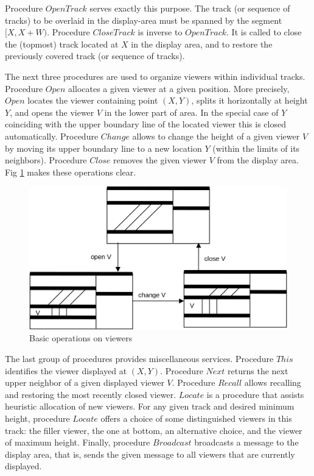 Procedure $OpenTrack$ serves exactly this purpose. The track (or sequence of tracks) to be
overlaid in the display-area must be spanned by the segment $[X, X + W)$. Procedure $CloseTrack$ is
inverse to $OpenTrack$. It is called to close the (topmost) track located at $X$ in the display area, and
to restore the previously covered track (or sequence of tracks).

The next three procedures are used to organize viewers within individual tracks. Procedure $Open$
allocates a given viewer at a given position. More precisely, $Open$ locates the viewer containing
point $(X, Y)$, splits it horizontally at height $Y$, and opens the viewer $V$ in the lower part of area. In the special case of $Y$ coinciding with the upper boundary line of the located viewer this is
closed automatically. Procedure $Change$ allows to change the height of a given viewer $V$ by
moving its upper boundary line to a new location $Y$ (within the limits of its neighbors). Procedure
$Close$ removes the given viewer $V$ from the display area. Fig \ref{fig:operation} makes these operations clear.
\begin{figure}
	\centering
	\includegraphics[width=\textwidth]{i/8}
	\caption{Basic operations on viewers}
	\label{fig:operation}
\end{figure}

The last group of procedures provides miscellaneous services. Procedure $This$ identifies the
viewer displayed at $(X, Y)$. Procedure $Next$ returns the next upper neighbor of a given displayed
viewer $V$. Procedure $Recall$ allows recalling and restoring the most recently closed viewer. $Locate$
is a procedure that assists heuristic allocation of new viewers. For any given track and desired
minimum height, procedure $Locate$ offers a choice of some distinguished viewers in this track: the
filler viewer, the one at bottom, an alternative choice, and the viewer of maximum height.
Finally, procedure $Broadcast$ broadcasts a message to the display area, that is, sends the given
message to all viewers that are currently displayed.

